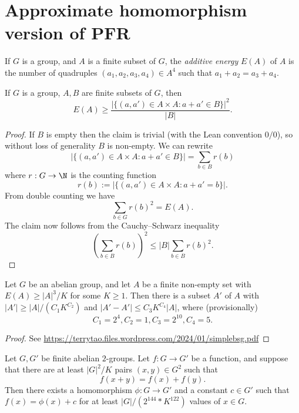 \chapter{Approximate homomorphism version of PFR}

\begin{definition}\label{energy-def}\leanok  If $G$ is a group, and $A$ is a finite subset of $G$, the \emph{additive energy} $E(A)$ of $A$ is the number of quadruples $(a_1,a_2,a_3,a_4) \in A^4$ such that $a_1+a_2 = a_3+a_4$.
\end{definition}

\begin{lemma}\label{cs-bound}\leanok  If $G$ is a group, $A,B$ are finite subsets of $G$, then
$$ E(A) \geq \frac{|\{ (a,a') \in A \times A: a+a' \in B \}|^2}{|B|}.$$
\end{lemma}

\begin{proof}\leanok  If $B$ is empty then the claim is trivial (with the Lean convention $0/0$), so without loss of generality $B$ is non-empty.  We can rewrite
$$ |\{ (a,a') \in A \times A: a+a' \in B \}| = \sum_{b \in B} r(b)$$
where $r: G \to \N$ is the counting function
$$ r(b) := |\{ (a,a') \in A \times A: a+a' = b \}|.$$
From double counting we have
$$ \sum_{b \in G} r(b)^2 = E(A).$$
The claim now follows from the Cauchy--Schwarz inequality
$$ (\sum_{b \in B} r(b))^2 \leq |B| \sum_{b \in B} r(b)^2.$$
\end{proof}

\begin{lemma}\label{bsg}\leanok Let $G$ be an abelian group, and let $A$ be a finite non-empty set with $E(A) \geq |A|^3 / K$ for some $K \geq 1$.  Then there is a subset $A'$ of $A$ with $|A'| \geq |A| / (C_1 K^{C_2})$ and $|A'-A'| \leq C_3 K^{C_4} |A|$, where (provisionally)
$$ C_1 = 2^4, C_2 = 1, C_3 = 2^{10}, C_4 = 5.$$
\end{lemma}

\begin{proof}\leanok See \url{https://terrytao.files.wordpress.com/2024/01/simplebsg.pdf}
\end{proof}

\begin{theorem}\label{approx-hom-pfr}\leanok Let $G,G'$ be finite abelian $2$-groups.
  Let $f: G \to G'$ be a function, and suppose that there are at least $|G|^2 / K$ pairs $(x,y) \in G^2$ such that
$$ f(x+y) = f(x) + f(y).$$
Then there exists a homomorphism $\phi: G \to G'$ and a constant $c \in G'$
such that $f(x) = \phi(x)+c$ for at least $|G| / (2 ^ {144} * K ^ {122})$
values of $x \in G$.
\end{theorem}

